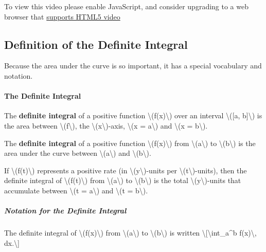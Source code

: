 To view this video please enable JavaScript, and consider upgrading to a
web browser that \href{http://videojs.com/html5-video-support/}{supports
HTML5 video}

\hypertarget{definition-of-the-definite-integral}{%
\subsection{Definition of the Definite
Integral}\label{definition-of-the-definite-integral}}

Because the area under the curve is so important, it has a special
vocabulary and notation.

\hypertarget{the-definite-integral}{%
\paragraph{The Definite Integral}\label{the-definite-integral}}

The \textbf{definite integral} of a positive function
\textbackslash{}(f(x)\textbackslash{}) over an interval
\textbackslash{}({[}a, b{]}\textbackslash{}) is the area between
\textbackslash{}(f\textbackslash{}), the
\textbackslash{}(x\textbackslash{})-axis, \textbackslash{}(x =
a\textbackslash{}) and \textbackslash{}(x = b\textbackslash{}).

The \textbf{definite integral} of a positive function
\textbackslash{}(f(x)\textbackslash{}) from
\textbackslash{}(a\textbackslash{}) to
\textbackslash{}(b\textbackslash{}) is the area under the curve between
\textbackslash{}(a\textbackslash{}) and
\textbackslash{}(b\textbackslash{}).

If \textbackslash{}(f(t)\textbackslash{}) represents a positive rate (in
\textbackslash{}(y\textbackslash{})-units per
\textbackslash{}(t\textbackslash{})-units), then the definite integral
of \textbackslash{}(f(t)\textbackslash{}) from
\textbackslash{}(a\textbackslash{}) to
\textbackslash{}(b\textbackslash{}) is the total
\textbackslash{}(y\textbackslash{})-units that accumulate between
\textbackslash{}(t = a\textbackslash{}) and \textbackslash{}(t =
b\textbackslash{}).

\hypertarget{notation-for-the-definite-integral}{%
\subparagraph{Notation for the Definite
Integral}\label{notation-for-the-definite-integral}}

The definite integral of \textbackslash{}(f(x)\textbackslash{}) from
\textbackslash{}(a\textbackslash{}) to
\textbackslash{}(b\textbackslash{}) is written
\textbackslash{}{[}\textbackslash{}int\_a\^{}b f(x)\textbackslash{},
dx.\textbackslash{}{]}

